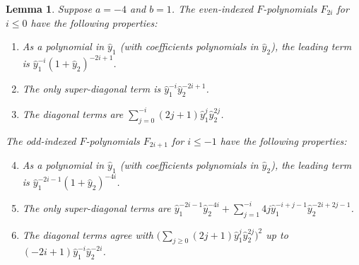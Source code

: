 \documentclass[10pt,a4paper]{amsart}
\newtheorem{lemma}[theorem]{Lemma}
\theoremstyle{definition}
\newcommand{\hy}{\hat{y}}
\begin{document}
\begin{lemma}\label{F coeffs asym}
Suppose $a=-4$ and $b=1$.
The even-indexed $F$-polynomials $F_{2i}$ for $i\le0$ have the following properties:
\begin{enumerate}[label=(\roman*)]%
\item \label{leading asym}
As a polynomial in $\hy_1$ (with coefficients polynomials in $\hy_2$), the leading term is $\hy_1^{-i}(1+\hy_2)^{-2i+1}$.
\item \label{super asym}
The only super-diagonal term is $\hy_1^{-i}\hy_2^{-2i+1}$.
\item \label{key terms asym}
The diagonal terms are $\sum_{j=0}^{-i}(2j+1)\hy_1^j\hy_2^{2j}$.
\end{enumerate}
The odd-indexed $F$-polynomials $F_{2i+1}$ for $i\le-1$ have the following properties:
\begin{enumerate}[label=(\roman*)] %
\setcounter{enumi}{3}
\item \label{leading asym odd}
As a polynomial in $\hy_1$ (with coefficients polynomials in $\hy_2$), the leading term is $\hy_1^{-2i-1}(1+\hy_2)^{-4i}$.
\item \label{super asym odd}
The only super-diagonal terms are $\hy_1^{-2i-1}\hy_2^{-4i}+\sum_{j=1}^{-i}4j\hy_1^{-i+j-1}\hy_2^{-2i+2j-1}$.
\item \label{key terms asym odd}
The diagonal terms agree with $\bigl(\sum_{j\ge0}(2j+1)\hy_1^j\hy_2^{2j}\bigr)^2$ up to $(-2i+1)\hy_1^{-i}\hy_2^{-2i}$.
\end{enumerate}
\end{lemma}
\end{document}
